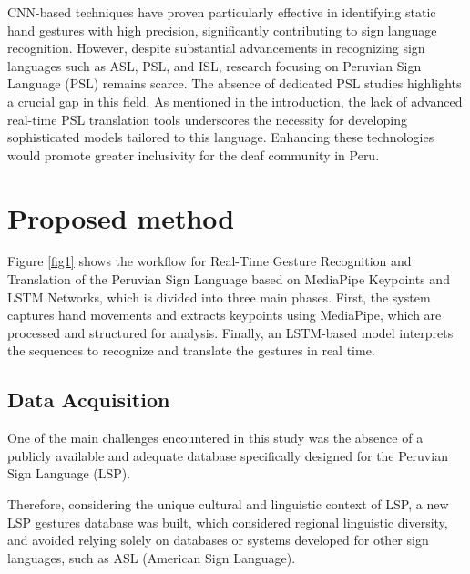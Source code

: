 \documentclass[preprint,12pt,authoryear]{elsarticle}
\begin{document}
CNN-based techniques have proven particularly effective in identifying static hand gestures with high precision, significantly contributing to sign language recognition. However, despite substantial advancements in recognizing sign languages such as ASL, PSL, and ISL, research focusing on Peruvian Sign Language (PSL) remains scarce. The absence of dedicated PSL studies highlights a crucial gap in this field. As mentioned in the introduction, the lack of advanced real-time PSL translation tools underscores the necessity for developing sophisticated models tailored to this language. Enhancing these technologies would promote greater inclusivity for the deaf community in Peru.


\section{Proposed method}
\label{sec:methodology}
Figure \ref{fig1} shows the workflow for Real-Time Gesture Recognition and Translation of the Peruvian Sign Language based on MediaPipe Keypoints and LSTM Networks, which is divided into three main phases. First, the system captures hand movements and extracts keypoints using MediaPipe, which are processed and structured for analysis. Finally, an LSTM-based model interprets the sequences to recognize and translate the gestures in real time.

\subsection{Data Acquisition}
One of the main challenges encountered in this study was the absence of a publicly available and adequate database specifically designed for the Peruvian Sign Language (LSP).

Therefore, considering the unique cultural and linguistic context of LSP, a new LSP gestures database was built, which considered regional linguistic diversity, and avoided relying solely on databases or systems developed for other sign languages, such as ASL (American Sign Language).
\end{document}
